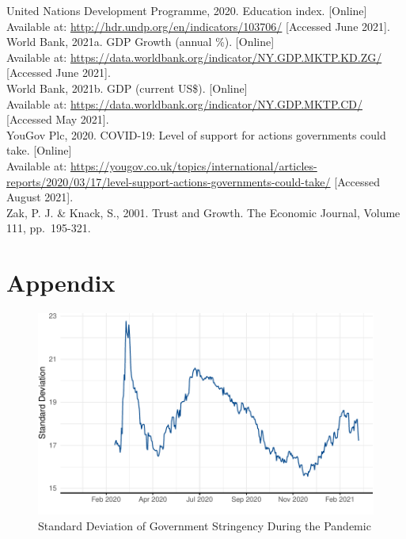 \documentclass[
  11pt,
]{article}
\begin{document}
United Nations Development Programme, 2020. Education index. {[}Online{]}\\
Available at: \url{http://hdr.undp.org/en/indicators/103706/}
{[}Accessed June 2021{]}.\\
World Bank, 2021a. GDP Growth (annual \%). {[}Online{]}\\
Available at: \url{https://data.worldbank.org/indicator/NY.GDP.MKTP.KD.ZG/}
{[}Accessed June 2021{]}.\\
World Bank, 2021b. GDP (current US\$). {[}Online{]}\\
Available at: \url{https://data.worldbank.org/indicator/NY.GDP.MKTP.CD/}
{[}Accessed May 2021{]}.\\
YouGov Plc, 2020. COVID-19: Level of support for actions governments could take. {[}Online{]}\\
Available at: \url{https://yougov.co.uk/topics/international/articles-reports/2020/03/17/level-support-actions-governments-could-take/}
{[}Accessed August 2021{]}.\\
Zak, P. J. \& Knack, S., 2001. Trust and Growth. The Economic Journal, Volume 111, pp.~195-321.\\

\newpage

\hypertarget{appendix}{%
\section*{Appendix}\label{appendix}}

\setcounter{table}{0}  \renewcommand{\thetable}{A\arabic{table}} \setcounter{figure}{0} \renewcommand{\thefigure}{A\arabic{figure}}

\begin{figure}
\includegraphics[width=0.8\linewidth]{write_up_test_files/figure-latex/stringency-sd-1} \caption{Standard Deviation of Government Stringency During the Pandemic}\label{fig:stringency-sd}
\end{figure}
\end{document}
